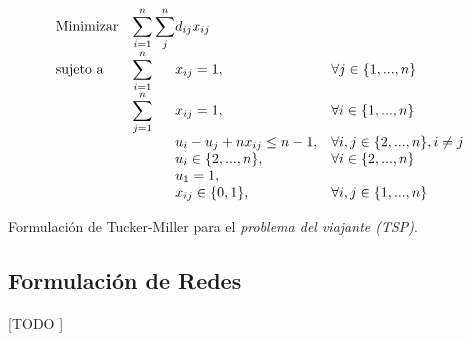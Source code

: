\documentclass[spanish]{article}
\begin{document}
				\begin{eqfloat}
					\begin{equation}
						\begin{array}{ll@{}ll}
							\text{Minimizar}	& \displaystyle\sum\limits_{i = 1}^{n}\sum\limits_{j}^{n} & d_{ij}x_{ij} &\\
							\text{sujeto a}		& \displaystyle\sum\limits_{i = 1}^{n}	&	x_{ij} 	= 1,  & \forall j \in \{1,...,n\} \\
																& \displaystyle\sum\limits_{j = 1}^{n}	&	x_{ij} 	= 1,  & \forall i \in \{1,...,n\} \\
																& 				&	u_i - u_j + n x_{ij}	\leq n-1,  & \forall i, j \in \{2,...,n\}, i \neq j \\
																&                               &	u_{i} \in \{2,...,n\}, 		& \forall i \in \{2,...,n\} \\
																&                               &	u_{1}  = 1, 	& \\
																&                               &	x_{ij} \in \{0,1\}, 	& \forall i,j \in \{1,...,n\}
						\end{array}
					\end{equation}
					\caption{Formulación de Tucker-Miller para el \emph{problema del viajante (TSP)}.}
					\label{eq:tsp_tm}
				\end{eqfloat}

			\subsection{Formulación de Redes}

				\paragraph{}
				[TODO ]
\end{document}
